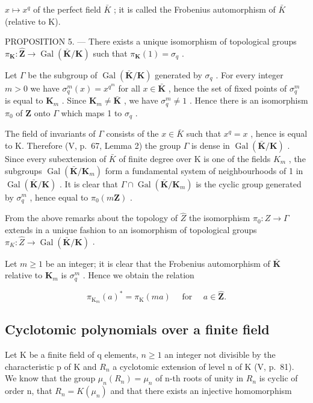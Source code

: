 \(x \mapsto x^{q}\) of the perfect field \(\bar{K}\) ; it is called the Frobenius automorphism of \(\bar{K}\) (relative to K).

PROPOSITION 5. --- There exists a unique isomorphism of topological groups \(\pi_{\mathbf{K}}: \hat{\mathbf{Z}} \to \operatorname{Gal}(\bar{\mathbf{K}} / \mathbf{K})\) such that \(\pi_{\mathbf{K}}(1) = \sigma_q\) .

Let \(\Gamma\) be the subgroup of \(\operatorname{Gal}(\bar{\mathbf{K}} / \mathbf{K})\) generated by \(\sigma_q\) . For every integer \(m > 0\) we have \(\sigma_q^m (x) = x^{q^m}\) for all \(x\in \bar{\mathbf{K}}\) , hence the set of fixed points of \(\sigma_q^m\) is equal to \(\mathbf{K}_m\) . Since \(\mathbf{K}_m\neq \bar{\mathbf{K}}\) , we have \(\sigma_q^m\neq 1\) . Hence there is an isomorphism \(\pi_0\) of \(\mathbf{Z}\) onto \(\Gamma\) which maps 1 to \(\sigma_q\) .

The field of invariants of \(\Gamma\) consists of the \(x \in \bar{K}\) such that \(x^{q} = x\) , hence is equal to K. Therefore (V, p.~67, Lemma 2) the group \(\Gamma\) is dense in \(\operatorname{Gal}(\bar{\mathbf{K}}/\mathbf{K})\) . Since every subextension of \(\bar{K}\) of finite degree over K is one of the fields \(K_{m}\) , the subgroups \(\operatorname{Gal}(\bar{\mathbf{K}}/\mathbf{K}_{m})\) form a fundamental system of neighbourhoods of 1 in \(\operatorname{Gal}(\bar{\mathbf{K}}/\mathbf{K})\) . It is clear that \(\Gamma \cap \operatorname{Gal}(\bar{\mathbf{K}}/\mathbf{K}_{m})\) is the cyclic group generated by \(\sigma_{q}^{m}\) , hence equal to \(\pi_{0}(m\mathbf{Z})\) .

From the above remarks about the topology of \(\hat{Z}\) the isomorphism \(\pi_{0}:Z\to\Gamma\) extends in a unique fashion to an isomorphism of topological groups \(\pi_{K}:\hat{Z}\to\operatorname{Gal}(\bar{\mathbf{K}}/\mathbf{K})\) .

Let \(m \geqslant 1\) be an integer; it is clear that the Frobenius automorphism of \(\bar{\mathbf{K}}\) relative to \(\mathbf{K}_m\) is \(\sigma_q^m\) . Hence we obtain the relation

\[
\pi_ {\mathrm{K} _ {m}} (a) ^ {*} = \pi_ {\mathrm{K}} (m a) \quad \text { for } \quad a \in \hat {\mathbf {Z}}.\tag{5}
\]

\subsection{Cyclotomic polynomials over a finite field}

Let K be a finite field of q elements, \(n \geqslant 1\) an integer not divisible by the characteristic p of K and \(R_{n}\) a cyclotomic extension of level n of K (V, p.~81). We know that the group \(\mu_{n}(R_{n}) = \mu_{n}\) of n-th roots of unity in \(R_{n}\) is cyclic of order n, that \(R_{n} = K(\mu_{n})\) and that there exists an injective homomorphism

